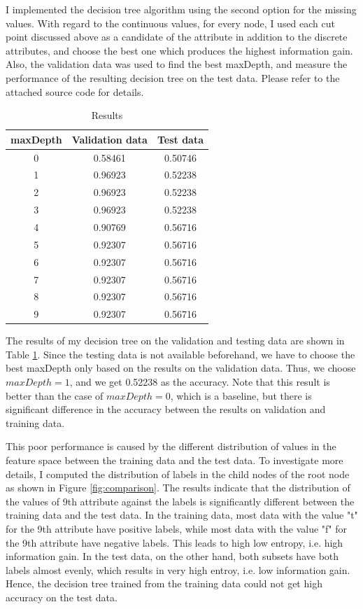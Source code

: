 \begin{enumerate}
I implemented the decision tree algorithm using the second option for the missing values. With regard to the continuous values, for every node, I used each cut point discussed above as a candidate of the attribute in addition to the discrete attributes, and choose the best one which produces the highest information gain. Also, the validation data was used to find the best maxDepth, and measure the performance of the resulting decision tree on the test data. Please refer to the attached source code for details.

\begin{table}[htb]
\begin{center}
\caption{Results}
\begin{tabular}{|c|c|c|} \hline
maxDepth & Validation data & Test data \\ \hline \hline
0 & 0.58461 & 0.50746 \\ \hline
1 & 0.96923 & 0.52238 \\ \hline
2 & 0.96923 & 0.52238 \\ \hline
3 & 0.96923 & 0.52238 \\ \hline
4 & 0.90769 & 0.56716 \\ \hline
5 & 0.92307 & 0.56716 \\ \hline
6 & 0.92307 & 0.56716 \\ \hline
7 & 0.92307 & 0.56716 \\ \hline
8 & 0.92307 & 0.56716 \\ \hline
9 & 0.92307 & 0.56716 \\ \hline
\end{tabular}
\label{tab:result}
\end{center}
\end{table}

The results of my decision tree on the validation and testing data are shown in Table \ref{tab:result}. Since the testing data is not available beforehand, we have to choose the best maxDepth only based on the results on the validation data. Thus, we choose $maxDepth=1$, and we get 0.52238 as the accuracy. Note that this result is better than the case of $maxDepth=0$, which is a baseline, but there is significant difference in the accuracy between the results on validation and training data.

This poor performance is caused by the different distribution of values in the feature space between the training data and the test data. To investigate more details, I computed the distribution of labels in the child nodes of the root node as shown in Figure \ref{fig:comparison}. The results indicate that the distribution of the values of 9th attribute against the labels is significantly different between the training data and the test data. In the training data, most data with the value "t" for the 9th attribute have positive labels, while most data with the value "f" for the 9th attribute have negative labels. This leads to high low entropy, i.e. high information gain. In the test data, on the other hand, both subsets have both labels almost evenly, which results in very high entroy, i.e. low information gain. Hence, the decision tree trained from the training data could not get high accuracy on the test data.


\end{enumerate}
